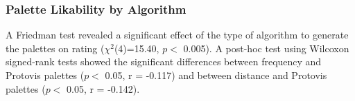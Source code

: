 \begin{center}
\end{center}

\subsubsection{Palette Likability by Algorithm} 
A Friedman test revealed a significant effect of the type of algorithm to generate the palettes on rating ($\chi^2$(4)=15.40, $p <$ 0.005). A post-hoc test using Wilcoxon signed-rank tests showed the significant differences between frequency and Protovis palettes ($p <$ 0.05, r = -0.117) and between distance and Protovis palettes ($p <$ 0.05, r = -0.142).

